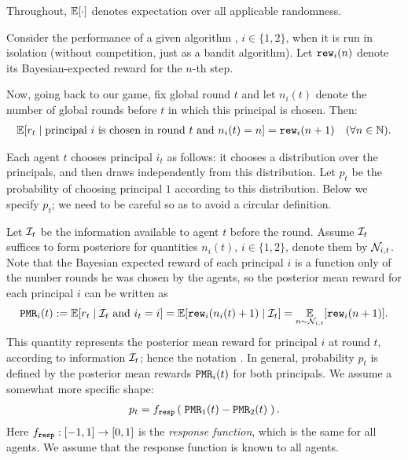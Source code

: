 Throughout, $\E[\cdot]$ denotes expectation over all applicable randomness.

Consider the performance of a given algorithm \alg[i], $i\in \{1,2\}$, when it is run in isolation (\ie without competition, just as a bandit algorithm). Let $\mathtt{rew}_i(n)$ denote its Bayesian-expected reward for the $n$-th step.

Now, going back to our game, fix global round $t$ and let $n_i(t)$ denote the number of global rounds before $t$ in which this principal is chosen. Then:
\begin{align*}
 \E[r_t \mid \text{principal $i$ is chosen in round $t$ and $n_i(t)=n$} ]
    = \rew_i(n+1) \quad (\forall n\in\N).
\end{align*}

Each agent $t$ chooses principal $i_t$ as follows: it chooses a distribution over the principals, and then draws independently from this distribution. Let $p_t$ be the probability of choosing principal $1$ according to this distribution. Below we specify $p_t$; we need to be careful so as to avoid a circular definition.


Let $\mathcal{I}_t$ be the information available to agent $t$ before the
round. Assume $\mathcal{I}_t$ suffices to form posteriors for quantities
$n_i(t)$, $i\in \{1,2\}$, denote them by $\mathcal{N}_{i,t}$. Note
that the Bayesian expected reward of each principal $i$ is a function
only of the number rounds he was chosen by the agents, so the
posterior mean reward for each principal $i$ can be written as
\begin{align*}
 \PMR_i(t) := \E[r_t \mid \text{$\mI_t$ and $i_t=i$} ]
    = \E[\rew_i(n_i(t)+1) \mid \mI_t]
    = \E_{n\sim \posteriorN{i}{t}}[\rew_i(n+1)].
\end{align*}
This quantity represents the posterior mean reward for principal $i$
at round $t$, according to information $\mathcal{I}_t$; hence the notation \PMR. In general, probability $p_t$ is defined by the
posterior mean rewards $\mathtt{PMR}_i(t)$ for both principals. We assume a
somewhat more specific shape:
\begin{align}
p_t = f_{\mathtt{resp}}\left(\; \mathtt{PMR}_1(t) - \mathtt{PMR}_2(t) \;\right).
\end{align}
Here $f_{\mathtt{resp}}:[-1,1]\to [0,1]$ is the \emph{response function}, which is the same for all agents. We assume that the response function is known to all agents.


